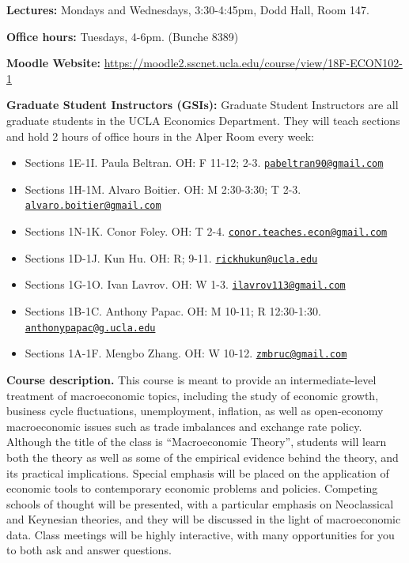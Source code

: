 \documentclass[]{book}
\providecommand{\tightlist}{%
  \setlength{\itemsep}{0pt}\setlength{\parskip}{0pt}}
\theoremstyle{definition}
\theoremstyle{definition}
\theoremstyle{definition}
\theoremstyle{remark}
\begin{document}
\textbf{Lectures:} Mondays and Wednesdays, 3:30-4:45pm, Dodd Hall, Room
147.

\textbf{Office hours:} Tuesdays, 4-6pm. (Bunche 8389)

\textbf{Moodle Website:}
\url{https://moodle2.sscnet.ucla.edu/course/view/18F-ECON102-1}

\textbf{Graduate Student Instructors (GSIs):} Graduate Student
Instructors are all graduate students in the UCLA Economics Department.
They will teach sections and hold 2 hours of office hours in the Alper
Room every week:

\begin{itemize}
\tightlist
\item
  Sections 1E-1I. Paula Beltran. OH: F 11-12; 2-3.
  \href{mailto:pabeltran90@gmail.com}{\nolinkurl{pabeltran90@gmail.com}}
\item
  Sections 1H-1M. Alvaro Boitier. OH: M 2:30-3:30; T 2-3.
  \href{mailto:alvaro.boitier@gmail.com}{\nolinkurl{alvaro.boitier@gmail.com}}
\item
  Sections 1N-1K. Conor Foley. OH: T 2-4.
  \href{mailto:conor.teaches.econ@gmail.com}{\nolinkurl{conor.teaches.econ@gmail.com}}
\item
  Sections 1D-1J. Kun Hu. OH: R; 9-11.
  \href{mailto:rickhukun@ucla.edu}{\nolinkurl{rickhukun@ucla.edu}}
\item
  Sections 1G-1O. Ivan Lavrov. OH: W 1-3.
  \href{mailto:ilavrov113@gmail.com}{\nolinkurl{ilavrov113@gmail.com}}
\item
  Sections 1B-1C. Anthony Papac. OH: M 10-11; R 12:30-1:30.
  \href{mailto:anthonypapac@g.ucla.edu}{\nolinkurl{anthonypapac@g.ucla.edu}}
\item
  Sections 1A-1F. Mengbo Zhang. OH: W 10-12.
  \href{mailto:zmbruc@gmail.com}{\nolinkurl{zmbruc@gmail.com}}
\end{itemize}

\textbf{Course description.} This course is meant to provide an
intermediate-level treatment of macroeconomic topics, including the
study of economic growth, business cycle fluctuations, unemployment,
inflation, as well as open-economy macroeconomic issues such as trade
imbalances and exchange rate policy. Although the title of the class is
``Macroeconomic Theory'', students will learn both the theory as well as
some of the empirical evidence behind the theory, and its practical
implications. Special emphasis will be placed on the application of
economic tools to contemporary economic problems and policies. Competing
schools of thought will be presented, with a particular emphasis on
Neoclassical and Keynesian theories, and they will be discussed in the
light of macroeconomic data. Class meetings will be highly interactive,
with many opportunities for you to both ask and answer questions.
\end{document}
